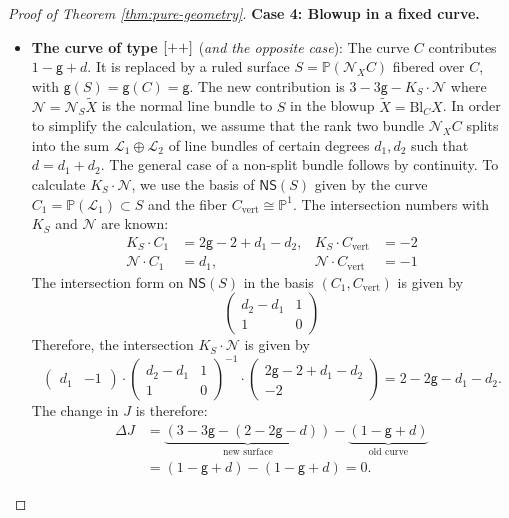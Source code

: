 \documentclass[10pt,a4paper]{amsart}
\newcommand{\lp}{\textup{\texttt{+}}}
\begin{document}
\begin{proof}[Proof of Theorem \ref{thm:pure-geometry}]
\noindent \textbf{Case 4: Blowup in a fixed curve.}
\begin{itemize}
    \item \textbf{The curve of type $[\lp\lp]$} (\textit{and the opposite case}): The curve $C$ contributes $1 - \mathsf{g} + d$. It is replaced by a ruled surface $S = \mathbb{P}(\mathcal{N}_XC)$ fibered over $C$, with $\mathsf{g}(S) = \mathsf{g}(C) = \mathsf{g}$. The new contribution is $3 - 3\mathsf{g} - K_S \cdot \mathcal{N}$ where $\mathcal N=\mathcal N_S \widetilde X$ is the normal line bundle to $S$ in the blowup $\widetilde X=\mathrm{Bl}_C X$. In order to simplify the calculation, we assume that the rank two bundle $\mathcal N_X C$ splits into the sum $\mathcal L_1\oplus \mathcal L_2$ of line bundles of certain degrees $d_1,d_2$ such that $d=d_1+d_2$. The general case of a non-split bundle follows by continuity. To calculate $K_S \cdot \mathcal{N}$, we use the basis of $\mathsf{NS}(S)$ given by the curve $C_1 = \mathbb{P}(\mathcal{L}_1)\subset S$ and the fiber $C_{\text{vert}} \cong \mathbb{P}^1$. The intersection numbers with $K_S$ and $\mathcal{N}$ are known:
    \begin{align}
        K_S \cdot C_1 &= 2\mathsf{g}-2 + d_1-d_2,  & K_S \cdot C_{\text{vert}} &= -2 \\
        \mathcal{N} \cdot C_1 &= d_1, & \mathcal{N} \cdot C_{\text{vert}} &= -1
    \end{align}
    The intersection form on $\mathsf{NS}(S)$ in the basis $(C_1,C_{\mathrm{vert}})$ is given by
    $$\begin{pmatrix}d_2-d_1 & 1\\1& 0\end{pmatrix}$$
    Therefore, the intersection $K_S\cdot \mathcal N$ is given by
    $$ \begin{pmatrix}d_1  &-1\end{pmatrix} \cdot \begin{pmatrix}d_2-d_1 & 1\\1& 0\end{pmatrix}^{-1}\cdot  \begin{pmatrix}2\mathsf{g}-2+d_1-d_2\\-2\end{pmatrix} =2-2\mathsf{g}-d_1-d_2.  $$
    The change in $J$ is therefore:
    \begin{align}
       \Delta J &=\underbrace{ (3 - 3\mathsf{g} - (2 - 2\mathsf{g} - d))}_{\text{new surface}} - \underbrace{(1 - \mathsf{g} + d)}_{\text{old curve}} \\
        &= (1 - \mathsf{g} + d) - (1 - \mathsf{g} + d) = 0.
    \end{align}


\end{itemize}
\end{proof}
\end{document}
